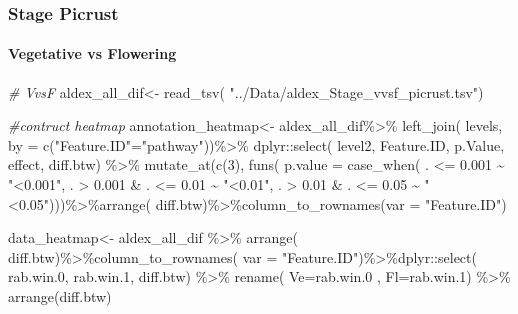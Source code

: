 \documentclass[]{interact}
\theoremstyle{plain}%
\theoremstyle{definition}
\theoremstyle{remark}
\newenvironment{Shaded}{\begin{snugshade}}{\end{snugshade}}
\newcommand{\AttributeTok}[1]{\textcolor[rgb]{0.77,0.63,0.00}{#1}}
\newcommand{\CommentTok}[1]{\textcolor[rgb]{0.56,0.35,0.01}{\textit{#1}}}
\newcommand{\DecValTok}[1]{\textcolor[rgb]{0.00,0.00,0.81}{#1}}
\newcommand{\FloatTok}[1]{\textcolor[rgb]{0.00,0.00,0.81}{#1}}
\newcommand{\FunctionTok}[1]{\textcolor[rgb]{0.00,0.00,0.00}{#1}}
\newcommand{\NormalTok}[1]{#1}
\newcommand{\OtherTok}[1]{\textcolor[rgb]{0.56,0.35,0.01}{#1}}
\newcommand{\SpecialCharTok}[1]{\textcolor[rgb]{0.00,0.00,0.00}{#1}}
\newcommand{\StringTok}[1]{\textcolor[rgb]{0.31,0.60,0.02}{#1}}
\begin{document}
\hypertarget{stage-picrust}{%
\subsubsection{Stage Picrust}\label{stage-picrust}}

\hypertarget{vegetative-vs-flowering}{%
\paragraph{Vegetative vs Flowering}\label{vegetative-vs-flowering}}

\begin{Shaded}
\begin{Highlighting}[]
\CommentTok{\# VvsF}
\NormalTok{aldex\_all\_dif}\OtherTok{\textless{}{-}} \FunctionTok{read\_tsv}\NormalTok{( }\StringTok{"../Data/aldex\_Stage\_vvsf\_picrust.tsv"}\NormalTok{)}


\CommentTok{\#contruct heatmap}
\NormalTok{annotation\_heatmap}\OtherTok{\textless{}{-}}\NormalTok{ aldex\_all\_dif}\SpecialCharTok{\%\textgreater{}\%} \FunctionTok{left\_join}\NormalTok{(}
\NormalTok{  levels, }\AttributeTok{by =} \FunctionTok{c}\NormalTok{(}\StringTok{"Feature.ID"}\OtherTok{=}\StringTok{"pathway"}\NormalTok{))}\SpecialCharTok{\%\textgreater{}\%}\NormalTok{ dplyr}\SpecialCharTok{::}\FunctionTok{select}\NormalTok{(}
\NormalTok{  level2, Feature.ID, p.Value, effect, diff.btw) }\SpecialCharTok{\%\textgreater{}\%} \FunctionTok{mutate\_at}\NormalTok{(}\FunctionTok{c}\NormalTok{(}\DecValTok{3}\NormalTok{), }\FunctionTok{funs}\NormalTok{(}
    \AttributeTok{p.value =} \FunctionTok{case\_when}\NormalTok{(}
\NormalTok{    . }\SpecialCharTok{\textless{}=} \FloatTok{0.001} \SpecialCharTok{\textasciitilde{}} \StringTok{"\textless{}0.001"}\NormalTok{,}
\NormalTok{    . }\SpecialCharTok{\textgreater{}}  \FloatTok{0.001} \SpecialCharTok{\&}\NormalTok{ .  }\SpecialCharTok{\textless{}=} \FloatTok{0.01} \SpecialCharTok{\textasciitilde{}} \StringTok{"\textless{}0.01"}\NormalTok{,}
\NormalTok{    . }\SpecialCharTok{\textgreater{}}  \FloatTok{0.01} \SpecialCharTok{\&}\NormalTok{ .  }\SpecialCharTok{\textless{}=} \FloatTok{0.05} \SpecialCharTok{\textasciitilde{}} \StringTok{"\textless{}0.05"}\NormalTok{)))}\SpecialCharTok{\%\textgreater{}\%}\FunctionTok{arrange}\NormalTok{(}
\NormalTok{      diff.btw)}\SpecialCharTok{\%\textgreater{}\%}\FunctionTok{column\_to\_rownames}\NormalTok{(}\AttributeTok{var =} \StringTok{"Feature.ID"}\NormalTok{)}

\NormalTok{data\_heatmap}\OtherTok{\textless{}{-}}\NormalTok{ aldex\_all\_dif }\SpecialCharTok{\%\textgreater{}\%} \FunctionTok{arrange}\NormalTok{(}
\NormalTok{  diff.btw)}\SpecialCharTok{\%\textgreater{}\%}\FunctionTok{column\_to\_rownames}\NormalTok{(}
\AttributeTok{var =} \StringTok{"Feature.ID"}\NormalTok{)}\SpecialCharTok{\%\textgreater{}\%}\NormalTok{dplyr}\SpecialCharTok{::}\FunctionTok{select}\NormalTok{(}
\NormalTok{  rab.win}\FloatTok{.0}\NormalTok{, rab.win}\FloatTok{.1}\NormalTok{, diff.btw) }\SpecialCharTok{\%\textgreater{}\%} \FunctionTok{rename}\NormalTok{(}
  \AttributeTok{Ve=}\NormalTok{rab.win}\FloatTok{.0}\NormalTok{ , }\AttributeTok{Fl=}\NormalTok{rab.win}\FloatTok{.1}\NormalTok{) }\SpecialCharTok{\%\textgreater{}\%} \FunctionTok{arrange}\NormalTok{(diff.btw)}


\end{Highlighting}
\end{Shaded}
\end{document}
